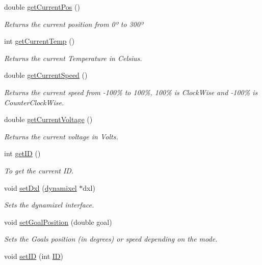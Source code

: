 \begin{DoxyCompactItemize}
double \hyperlink{a00001_af9722b9c1f82fbfd97fe5e0a44369e8a}{get\+Current\+Pos} ()
\begin{DoxyCompactList}\small\item\em Returns the current position from 0º to 300º \end{DoxyCompactList}\item 
int \hyperlink{a00001_ab16fad4c8c034d56acce15fc9102f34d}{get\+Current\+Temp} ()
\begin{DoxyCompactList}\small\item\em Returns the current Temperature in Celsius. \end{DoxyCompactList}\item 
double \hyperlink{a00001_a23c7ed54716c4b144a68d801f324e3ef}{get\+Current\+Speed} ()
\begin{DoxyCompactList}\small\item\em Returns the current speed from -\/100\% to 100\%, 100\% is Clock\+Wise and -\/100\% is Counter\+Clock\+Wise. \end{DoxyCompactList}\item 
double \hyperlink{a00001_a9ef946bfc1ad4dce5fed4101ed321efe}{get\+Current\+Voltage} ()
\begin{DoxyCompactList}\small\item\em Returns the current voltage in Volts. \end{DoxyCompactList}\item 
int \hyperlink{a00001_a745ab1f31fa2cd8c7a5797aeb605cd0b}{get\+I\+D} ()
\begin{DoxyCompactList}\small\item\em To get the current I\+D. \end{DoxyCompactList}\item 
void \hyperlink{a00001_a74a5a89387f0f51e053f05a6c2c0b9c5}{set\+Dxl} (\hyperlink{a00003}{dynamixel} $\ast$dxl)
\begin{DoxyCompactList}\small\item\em Sets the dynamixel interface. \end{DoxyCompactList}\item 
void \hyperlink{a00001_a6b27a3c6314604b499d9fa47d180f5d3}{set\+Goal\+Position} (double goal)
\begin{DoxyCompactList}\small\item\em Sets the Goal\textquotesingle{}s position (in degrees) or speed depending on the mode. \end{DoxyCompactList}\item 
void \hyperlink{a00001_ab9fe5d0e2286985977985de6d84b1103}{set\+I\+D} (int \hyperlink{a00001_a08d272b502d65464202a3aa97825aec0ab2565d5698c9d943a8bcecf02b1389ad}{I\+D})

\end{DoxyCompactItemize}
